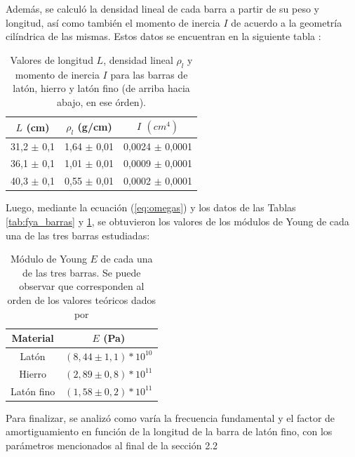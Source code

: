 \documentclass[twoside,twocolumn,a4paper]{article}
\begin{document}
Adem\'as, se calcul\'o la densidad lineal de cada barra a partir de su peso y longitud, as\'i como tambi\'en el momento de inercia $I$ de acuerdo a la geometr\'ia cil\'indrica de las mismas. Estos datos se encuentran en la siguiente tabla :

\begin{table}[H]
\centering
\caption{Valores de longitud $L$, densidad lineal $\rho_{l}$ y momento de inercia $I$ para las barras de lat\'on, hierro y lat\'on fino (de arriba hacia abajo, en ese \'orden).}
\label{tab:params_barras}
\begin{tabular}{|c|c|c|}
\hline
$L$ (cm) & $\rho_{l}$ (g/cm) & $I$ $(cm^{4})$\\ \hline
31,2 $\pm$ 0,1 & 1,64 $\pm$ 0,01 & 0,0024 $\pm$ 0,0001\\ \hline
36,1 $\pm$ 0,1 & 1,01 $\pm$ 0,01 & 0,0009 $\pm$ 0,0001\\ \hline
40,3 $\pm$ 0,1 & 0,55 $\pm$ 0,01 & 0,0002 $\pm$ 0,0001\\ \hline
\end{tabular}
\end{table}


Luego, mediante la ecuaci\'on (\ref{eq:omegas}) y los datos de las Tablas \ref{tab:fya_barras} y \ref{tab:params_barras}, se obtuvieron los valores de los m\'odulos de Young de cada una de las tres barras estudiadas:

\begin{table}[H]
\centering
\caption{M\'odulo de Young $E$ de cada una de las tres barras. Se puede observar que corresponden al orden de los valores te\'oricos dados por \cite{teo:ashby}}

\label{tab:young_barras}
\begin{tabular}{|c|c|}
\hline
Material & $E$ (Pa)\\ \hline
Lat\'on & $(8,44 \pm 1,1) * 10^{10}$\\ \hline
Hierro & $(2,89 \pm 0,8) * 10^{11}$\\ \hline
Lat\'on fino & $(1,58 \pm 0,2) * 10^{11}$\\ \hline
\end{tabular}
\end{table}

Para finalizar, se analiz\'o como var\'ia la frecuencia fundamental y el factor de amortiguamiento en funci\'on de la longitud de la barra de lat\'on fino, con los par\'ametros mencionados al final de  la secci\'on 2.2
\end{document}
